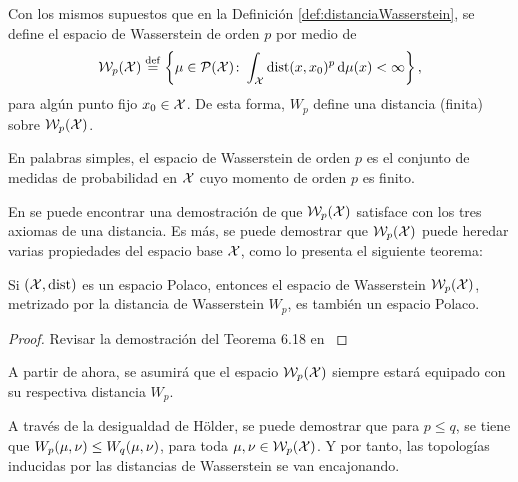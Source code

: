 {{	  \begin{definition}
		  Con los mismos supuestos que en la Definición \ref{def:distanciaWasserstein}, se define el espacio de Wasserstein de orden $p$ por medio de
		  \begin{equation}
			  \WassersteinSpace[p]{\cX} \eqdef \left\{
			  \mu \in \ProbSpace[\cX] \colon \int_{\cX} \dist(x, x_0)^{p} \dmu[x] < \infty
			  \right\},
		  \end{equation}
		  para algún punto fijo $x_0 \in \cX$. De esta forma, $W_p$ define una distancia (finita) sobre $\WassersteinSpace[p]{\cX}$.
	  \end{definition}

	  En palabras simples, el espacio de Wasserstein de orden $p$ es el conjunto de medidas de probabilidad en $\cX$ cuyo momento de orden $p$ es finito.

	  En \cite[p. 94]{villani2009optimal} se puede encontrar una demostración de que $\WassersteinSpace[p]{\cX}$ satisface con los tres axiomas de una distancia. Es más, se puede demostrar que $\WassersteinSpace[p]{\cX}$ puede heredar varias propiedades del espacio base $\cX$, como lo presenta el siguiente teorema:
	  \begin{theorem}
		  \label{thm:espacioWassersteinEsMetrico}
		  Si $(\cX, \dist)$ es un espacio Polaco, entonces el espacio de Wasserstein $\WassersteinSpace[p]{\cX} $, metrizado por la distancia de Wasserstein $W_p$, es también un espacio Polaco.
	  \end{theorem}

	  \begin{proof}
		  Revisar la demostración del Teorema 6.18 en \cite[p. 105]{villani2009optimal}
	  \end{proof}


	  A partir de ahora, se asumirá que el espacio $\WassersteinSpace[p]{\cX} $ siempre estará equipado con su respectiva distancia $W_p$.

	  \begin{remark}
		  A través de la desigualdad de Hölder, se puede demostrar que para $p \leq q$, se tiene que $\Wasserstein[p]{\mu}{\nu} \leq \Wasserstein[q]{\mu}{\nu}$, para toda $\mu, \nu \in \WassersteinSpace[p]{\cX}$. Y por tanto, las topologías inducidas por las distancias de Wasserstein se van encajonando.


\end{remark}}}
